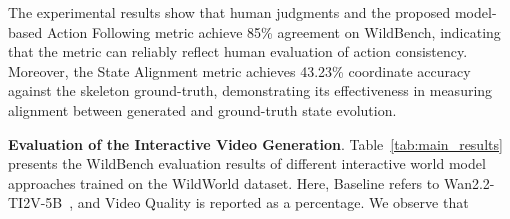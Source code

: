 The experimental results show that human judgments and the proposed model-based Action Following metric achieve 85\% agreement on WildBench, indicating that the metric can reliably reflect human evaluation of action consistency.
Moreover, the State Alignment metric achieves 43.23\% coordinate accuracy against the  skeleton ground-truth, demonstrating its effectiveness in measuring alignment between generated and ground-truth state evolution.

\noindent
\textbf{Evaluation of the Interactive Video Generation}. Table~\ref{tab:main_results} presents the WildBench evaluation results of different interactive world model approaches trained on the WildWorld dataset. Here, Baseline refers to Wan2.2-TI2V-5B~\cite{wan2025wan}, and Video Quality is reported as a percentage. We observe that

